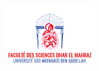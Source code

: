 \documentclass[A4paper,12pt]{report}
\begin{document}
\begin{titlepage}
   
   


\begin{center}
    \includegraphics[width=0.3\textwidth]{logo}\par\vspace{1cm}
\end{center}


\end{titlepage}
\end{document}
